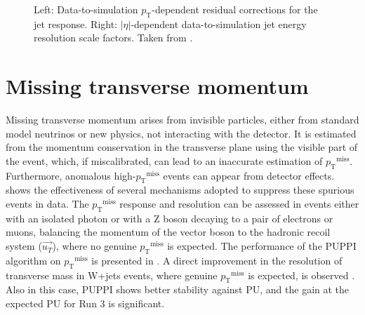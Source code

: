 \documentclass[a4paper,11pt]{article}
\newcommand{\pt}{\ensuremath{p_{\text{T}}}\xspace}
\newcommand{\ptmiss}{\ensuremath{\pt^\text{miss}}\xspace}
\begin{document}
\begin{figure}[htb]
\centering
{}
\caption{ Left: Data-to-simulation \pt-dependent residual corrections for the jet response. Right: $|\eta|$-dependent data-to-simulation jet energy resolution scale factors. Taken from \citep{JERCNotes}.}
\label{fig:JECUncJER}
\end{figure}



\section{Missing transverse momentum}

Missing transverse momentum arises from invisible particles, either from standard model neutrinos or new physics, not interacting with the detector. It is estimated from the momentum conservation in the transverse plane using the visible part of the event, which, if miscalibrated, can lead to an inaccurate estimation of \ptmiss \citep{MET}.
Furthermore, anomalous high-\ptmiss events can appear from detector effects.  shows the effectiveness of several mechanisms adopted to suppress these spurious events in data.
The \ptmiss response and resolution can be assessed in events either with an isolated photon or with a Z boson decaying to a pair of electrons or muons, balancing the momentum of the vector boson to the hadronic recoil system ($\vec{u_T}$), where no genuine \ptmiss is expected.
The performance of the PUPPI algorithm on \ptmiss is presented in . A direct improvement in the resolution of transverse mass in W+jets events, where genuine \ptmiss is expected, is observed \citep{MET}. Also in this case, PUPPI shows better stability against PU, and the gain at the expected PU for Run 3 is significant.
\end{document}
